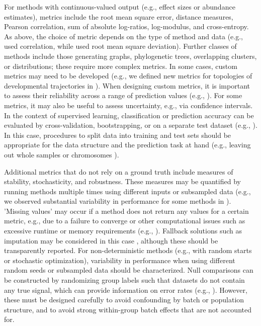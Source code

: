 For methods with continuous-valued output (e.g., effect sizes or abundance estimates), metrics include the root mean square error, distance measures, Pearson correlation, sum of absolute log-ratios, log-modulus, and cross-entropy. As above, the choice of metric depends on the type of method and data (e.g., \cite{costello_communityeffortassess_2014,lindgreen_evaluationaccuracyspeed_2016}  used correlation, while \cite{moult_criticalassessmentmethods_2016} used root mean square deviation). Further classes of methods include those generating graphs, phylogenetic trees, overlapping clusters, or distributions; these require more complex metrics. In some cases, custom metrics may need to be developed (e.g., we defined new metrics for topologies of developmental trajectories in \cite{saelens_comparisonsinglecelltrajectory_2019}). When designing custom metrics, it is important to assess their reliability across a range of prediction values (e.g., \cite{gurevich_quastqualityassessment_2013,narzisi_comparingnovogenome_2011}). For some metrics, it may also be useful to assess uncertainty, e.g., via confidence intervals. In the context of supervised learning, classification or prediction accuracy can be evaluated by cross-validation, bootstrapping, or on a separate test dataset (e.g., \cite{gardner_identifyingaccuratemetagenome_2019,aghaeepour_benchmarkevaluationalgorithms_2016}). In this case, procedures to split data into training and test sets should be appropriate for the data structure and the prediction task at hand (e.g., leaving out whole samples or chromosomes \cite{schreiber_pitfallmachinelearning_2019}).

Additional metrics that do not rely on a ground truth include measures of stability, stochasticity, and robustness. These measures may be quantified by running methods multiple times using different inputs or subsampled data (e.g., we observed substantial variability in performance for some methods in \cite{soneson_biasrobustnessscalability_2018,weber_comparisonclusteringmethods_2016}). 'Missing values' may occur if a method does not return any values for a certain metric, e.g., due to a failure to converge or other computational issues such as excessive runtime or memory requirements (e.g., \cite{saelens_comparisonsinglecelltrajectory_2019, soneson_biasrobustnessscalability_2018,weber_comparisonclusteringmethods_2016}). Fallback solutions such as imputation may be considered in this case \cite{bischl_benchmarkinglocalclassification_2013}, although these should be transparently reported. For non-deterministic methods (e.g., with random starts or stochastic optimization), variability in performance when using different random seeds or subsampled data should be characterized. Null comparisons can be constructed by randomizing group labels such that datasets do not contain any true signal, which can provide information on error rates (e.g., \cite{weber_diffcytdifferentialdiscovery_2019,zhou_robustlydetectingdifferential_2014,law_voomprecisionweights_2014}). However, these must be designed carefully to avoid confounding by batch or population structure, and to avoid strong within-group batch effects that are not accounted for.

